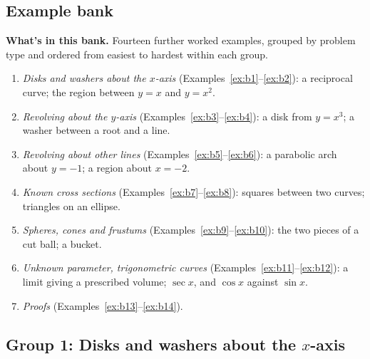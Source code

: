 \documentclass[11pt]{article}
\begin{document}
\subsection*{Example bank}

\textbf{What's in this bank.} Fourteen further worked examples, grouped by problem type and ordered from easiest to hardest within each group.
\begin{enumerate}[nosep]
  \item \emph{Disks and washers about the $x$-axis} (Examples~\ref{ex:b1}--\ref{ex:b2}): a reciprocal curve; the region between $y=x$ and $y=x^2$.
  \item \emph{Revolving about the $y$-axis} (Examples~\ref{ex:b3}--\ref{ex:b4}): a disk from $y=x^3$; a washer between a root and a line.
  \item \emph{Revolving about other lines} (Examples~\ref{ex:b5}--\ref{ex:b6}): a parabolic arch about $y=-1$; a region about $x=-2$.
  \item \emph{Known cross sections} (Examples~\ref{ex:b7}--\ref{ex:b8}): squares between two curves; triangles on an ellipse.
  \item \emph{Spheres, cones and frustums} (Examples~\ref{ex:b9}--\ref{ex:b10}): the two pieces of a cut ball; a bucket.
  \item \emph{Unknown parameter, trigonometric curves} (Examples~\ref{ex:b11}--\ref{ex:b12}): a limit giving a prescribed volume; $\sec x$, and $\cos x$ against $\sin x$.
  \item \emph{Proofs} (Examples~\ref{ex:b13}--\ref{ex:b14}).
\end{enumerate}

\subsection*{Group 1: Disks and washers about the $x$-axis}
\end{document}
